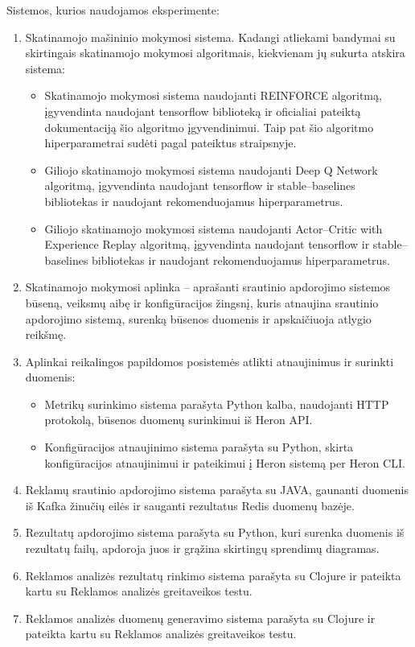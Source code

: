 \documentclass{VUMIFPSbakalaurinis}
\begin{document}
Sistemos, kurios naudojamos eksperimente:
\begin{enumerate}
    \item Skatinamojo mašininio mokymosi sistema. Kadangi atliekami bandymai su skirtingais skatinamojo mokymosi algoritmais, kiekvienam jų sukurta atskira sistema: 
    \begin{itemize}
        \item Skatinamojo mokymosi sistema naudojanti REINFORCE algoritmą, įgyvendinta naudojant tensorflow biblioteką ir oficialiai pateiktą dokumentaciją šio algoritmo įgyvendinimui. Taip pat šio algoritmo hiperparametrai sudėti pagal pateiktus \cite{vaquero2018autotuning} straipsnyje.
        \item Giliojo skatinamojo mokymosi sistema naudojanti Deep Q Network algoritmą, įgyvendinta naudojant tensorflow ir stable–baselines bibliotekas ir naudojant rekomenduojamus hiperparametrus.
        \item Giliojo skatinamojo mokymosi sistema naudojanti Actor–Critic with Experience Replay algoritmą, įgyvendinta naudojant tensorflow ir stable–baselines bibliotekas ir naudojant rekomenduojamus hiperparametrus.
    \end{itemize}
    \item Skatinamojo mokymosi aplinka – aprašanti srautinio apdorojimo sistemos būseną, veiksmų aibę ir konfigūracijos žingsnį, kuris atnaujina srautinio apdorojimo sistemą, surenką būsenos duomenis ir apskaičiuoja atlygio reikšmę. 
    \item Aplinkai reikalingos papildomos posistemės atlikti atnaujinimus ir surinkti duomenis:
    \begin{itemize}
        \item Metrikų surinkimo sistema parašyta Python kalba, naudojanti HTTP protokolą, būsenos duomenų surinkimui iš Heron API.
        \item Konfigūracijos atnaujinimo sistema parašyta su Python, skirta konfigūracijos atnaujinimui ir pateikimui į Heron sistemą per Heron CLI.
    \end{itemize}
    \item Reklamų srautinio apdorojimo sistema parašyta su JAVA, gaunanti duomenis iš Kafka žinučių eilės ir sauganti rezultatus Redis duomenų bazėje.
    \item Rezultatų apdorojimo sistema parašyta su Python, kuri surenka duomenis iš rezultatų failų, apdoroja juos ir grąžina skirtingų sprendimų diagramas.
    \item Reklamos analizės rezultatų rinkimo sistema parašyta su Clojure ir pateikta kartu su Reklamos analizės greitaveikos testu.
    \item Reklamos analizės duomenų generavimo sistema parašyta su Clojure ir pateikta kartu su Reklamos analizės greitaveikos testu.
\end{enumerate}
\end{document}
